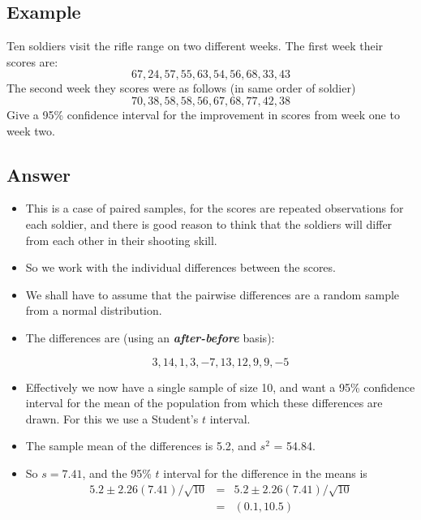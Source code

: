\documentclass[a4paper,12pt]{article}
\begin{document}
\newpage 
\subsection*{Example}
Ten soldiers visit the rifle range on two different weeks. The first
week their scores are:
\[67, 24, 57, 55, 63, 54, 56, 68, 33, 43\]
The second week they scores were as follows (in same order of soldier)
\[70, 38, 58, 58, 56, 67, 68, 77, 42, 38\]
Give a 95\% confidence interval for the improvement in scores from week one to
week two.


\subsection*{Answer}

\begin{itemize}
\item This is a case of paired samples, for the scores are repeated observations for each
soldier, and there is good reason to think that the soldiers will differ from each other
in their shooting skill. 
\item So we work with the individual differences between the scores.
\item We shall have to assume that the pairwise differences are a random sample from a
normal distribution.
\item 
The differences are (using an \textbf{\textit{after-before}} basis):

\[3, 14, 1, 3, -7, 13, 12, 9, 9, -5\]
\end{itemize}
\smallskip

\begin{itemize}
\item Effectively we now have a single sample of size 10, and want a 95\% confidence
interval for the mean of the population from which these differences are drawn. For
this we use a Student's $t$ interval.
\item  The sample mean of the differences is 5.2, and
$s^2$ = 54.84. 
\item So $s = 7.41$, and the 95\% $t$ interval for the difference in the means is
\begin{eqnarray*}5.2 \pm 2.26(7.41)/\sqrt{10} &=&  5.2 \pm 2.26(7.41)/\sqrt{10} \\&=& (0.1, 10.5)\end{eqnarray*}
\end{itemize}
\end{document}
